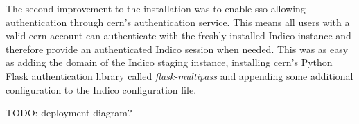The second improvement to the installation was to enable \gls{sso} allowing authentication through \gls{cern}'s authentication service. This means all users with a valid \gls{cern} account can authenticate with the freshly installed Indico instance and therefore provide an authenticated Indico session when needed. This was as easy as adding the domain of the Indico staging instance, installing \gls{cern}'s Python Flask authentication library called \textit{flask-multipass} \cite{flask-multipass} and appending some additional configuration to the Indico configuration file.

TODO: deployment diagram?